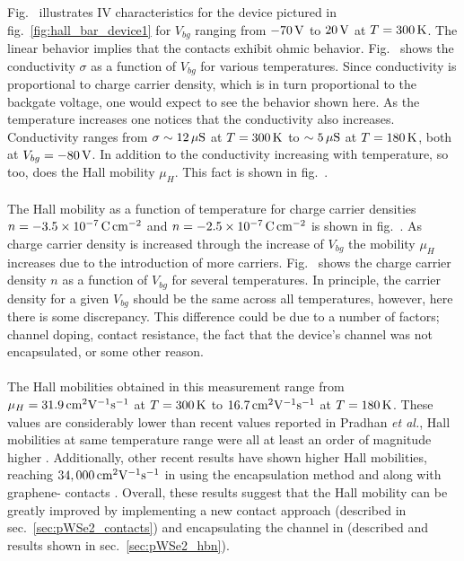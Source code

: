 \noindent Fig.~ illustrates IV characteristics for the device pictured in fig.~\ref{fig:hall_bar_device1} for $V_{bg}$ ranging from $-70\,\mathrm{V}$ to $20\,\mathrm{V}$ at $T=300\,\mathrm{K}$. The linear behavior implies that the contacts exhibit ohmic behavior. Fig.~ shows the conductivity $\sigma$ as a function of $V_{bg}$ for various temperatures. Since conductivity is proportional to charge carrier density, which is in turn proportional to the backgate voltage, one would expect to see the behavior shown here. As the temperature increases one notices that the conductivity also increases. Conductivity ranges from $\sigma\sim 12\,\mathrm{\mu S}$ at $T=300\,\mathrm{K}$ to $\sim 5\,\mathrm{\mu S}$ at $T=180\,\mathrm{K}$, both at $V_{bg}=-80\,\mathrm{V}$. In addition to the conductivity increasing with temperature, so too, does the Hall mobility $\mu_H$. This fact is shown in fig.~. \\ \\

\noindent The Hall mobility as a function of temperature for charge carrier densities $n=-3.5\times 10^{-7}\,\mathrm{C}\,\mathrm{cm}^{-2}$ and $n=-2.5\times 10^{-7}\,\mathrm{C}\,\mathrm{cm}^{-2}$ is shown in fig.~. As charge carrier density is increased through the increase of $V_{bg}$ the mobility $\mu_H$ increases due to the introduction of more carriers. Fig.~ shows the charge carrier density $n$ as a function of $V_{bg}$ for several temperatures. In principle, the carrier density for a given $V_{bg}$ should be the same across all temperatures, however, here there is some discrepancy. This difference could be due to a number of factors; channel doping, contact resistance, the fact that the device's channel was not encapsulated, or some other reason. \\ \\ 

\noindent The Hall mobilities obtained in this measurement range from $\mu_H=31.9\,\mathrm{cm}^{2}\mathrm{V}^{-1}\mathrm{s}^{-1}$ at $T=300\,\mathrm{K}$ to $16.7\,\mathrm{cm}^{2}\mathrm{V}^{-1}\mathrm{s}^{-1}$ at $T=180\,\mathrm{K}$. These values are considerably lower than recent values reported in Pradhan \emph{et al.}, Hall mobilities at same temperature range were all at least an order of magnitude higher \cite{Pradhan_SciReports2015}. Additionally, other recent results have shown higher Hall mobilities, reaching $34,000\,\mathrm{cm}^{2}\mathrm{V}^{-1}\mathrm{s}^{-1}$ in  using the \hbn encapsulation method and  along with graphene- contacts \cite{Li_NatureNano2015}. Overall, these results suggest that the Hall mobility can be greatly improved by implementing a new contact approach (described in sec.~\ref{sec:pWSe2_contacts}) and encapsulating the channel in \hbn (described and results shown in sec.~\ref{sec:pWSe2_hbn}). 

